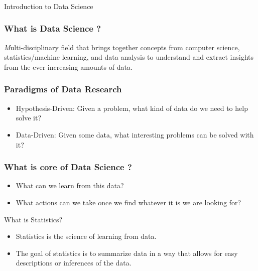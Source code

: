 \begin{frame}[fragile]\frametitle{}
\begin{center}
{\Large Introduction to Data Science}
\end{center}
\end{frame}

\begin{frame}[fragile]\frametitle{What is Data Science ?}	

{\textit Multi-disciplinary field that brings together concepts
from computer science, statistics/machine learning, and
data analysis to understand and extract insights from the
ever-increasing amounts of data.}

\end{frame}


\begin{frame}[fragile]\frametitle{Paradigms of Data Research}	
\begin{itemize}
\item  Hypothesis-Driven: Given a problem, what kind of data do we need to help solve it?
\item  Data-Driven: Given some data, what interesting problems can be solved with it?
\end{itemize}
\end{frame}

\begin{frame}[fragile]\frametitle{What is core of Data Science ?}	
\begin{itemize}
\item  What can we learn from this data?
\item  What actions can we take once we find whatever it is we are looking for?
\end{itemize}
\end{frame}



\begin{frame}{What is Statistics?}
\begin{itemize}
\item Statistics is the science of learning from data. 
\item The goal of statistics is to summarize data in a way that allows for easy descriptions or inferences of the data.
\end{itemize}
\end{frame}



